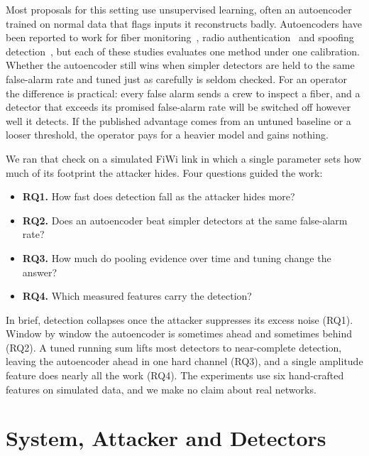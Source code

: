 \documentclass[conference]{IEEEtran}
\begin{document}
Most proposals for this setting use unsupervised learning, often an autoencoder trained on normal data that flags inputs it reconstructs badly. Autoencoders have been reported to work for fiber monitoring~\cite{abdelli2022}, radio authentication~\cite{senigagliesi2025} and spoofing detection~\cite{chen2025mris}, but each of these studies evaluates one method under one calibration. Whether the autoencoder still wins when simpler detectors are held to the same false-alarm rate and tuned just as carefully is seldom checked. For an operator the difference is practical: every false alarm sends a crew to inspect a fiber, and a detector that exceeds its promised false-alarm rate will be switched off however well it detects. If the published advantage comes from an untuned baseline or a looser threshold, the operator pays for a heavier model and gains nothing.

We ran that check on a simulated FiWi link in which a single parameter sets how much of its footprint the attacker hides. Four questions guided the work:
\begin{itemize}
\item \textbf{RQ1.} How fast does detection fall as the attacker hides more?
\item \textbf{RQ2.} Does an autoencoder beat simpler detectors at the same false-alarm rate?
\item \textbf{RQ3.} How much do pooling evidence over time and tuning change the answer?
\item \textbf{RQ4.} Which measured features carry the detection?
\end{itemize}
In brief, detection collapses once the attacker suppresses its excess noise (RQ1). Window by window the autoencoder is sometimes ahead and sometimes behind (RQ2). A tuned running sum lifts most detectors to near-complete detection, leaving the autoencoder ahead in one hard channel (RQ3), and a single amplitude feature does nearly all the work (RQ4). The experiments use six hand-crafted features on simulated data, and we make no claim about real networks.

\section{System, Attacker and Detectors}
\end{document}

